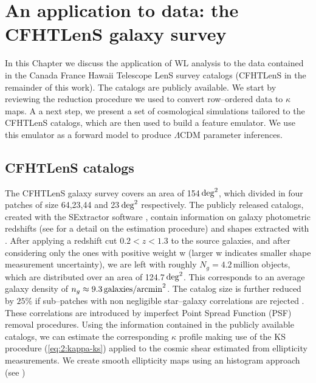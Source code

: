 
\chapter{An application to data: the CFHTLenS galaxy survey}
 \thispagestyle{plain}
\setlength{\parindent}{10mm}

\label{chp:6}

In this Chapter we discuss the application of WL analysis to the data contained in the Canada France Hawaii Telescope LenS survey catalogs \citep{cfht1,cfht2,CFHTKilbinger} (CFHTLenS in the remainder of this work). The catalogs are publicly available. We start by reviewing the reduction procedure we used to convert row--ordered data to $\kappa$ maps. A a next step, we present a set of cosmological simulations tailored to the CFHTLenS catalogs, which are then used to build a feature emulator. We use this emulator as a forward model to produce $\Lambda$CDM parameter inferences.   

\section{CFHTLenS catalogs}
The CFHTLenS galaxy survey covers an area of 154\,${\rm deg}^2$, which divided in four patches of size 64,23,44 and 23\,${\rm deg}^2$ respectively. The publicly released catalogs, created with the SExtractor software \citep{SExtractor}, contain information on galaxy photometric redshifts (see \citep{cfhtPhoto} for a detail on the estimation procedure) and shapes extracted with  \citep{cfht1,cfht2}. After applying a redshift cut $0.2<z<1.3$ to the source galaxies, and after considering only the ones with positive weight w (larger w indicates smaller shape measurement uncertainty), we are left with roughly $N_g=4.2$\,million objects, which are distributed over an area of 124.7\,${\rm deg}^2$. This corresponds to an average galaxy density of $n_g\approx 9.3\,{\rm galaxies/arcmin}^2$. The catalog size is further reduced by $25\%$ if sub--patches with non negligible star--galaxy correlations are rejected \citep{CFHTFu}. These correlations are introduced by imperfect Point Spread Function (PSF) removal procedures. Using the information contained in the publicly available catalogs, we can estimate the corresponding $\kappa$ profile making use of the KS procedure (\ref{eq:2:kappa-ks}) applied to the cosmic shear estimated from ellipticity measurements. We create smooth ellipticity maps using an histogram approach (see \citep{PetriCFHTMink,PetriCFHTPeaks})

